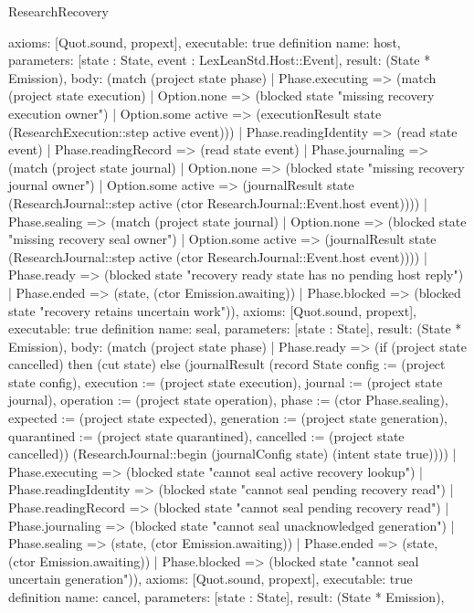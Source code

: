 \begin{lexlean}{ResearchRecovery}
\begin{semanticmodule}
{ axioms: [Quot.sound, propext],
 executable: true
}
definition{
 name: host,
 parameters: [state : State, event : LexLeanStd.Host::Event],
 result: (State * Emission),
 body: (match (project state phase) | Phase.executing => (match (project state execution) | Option.none => (blocked state "missing recovery execution owner") | Option.some active => (executionResult state (ResearchExecution::step active event))) | Phase.readingIdentity => (read state event) | Phase.readingRecord => (read state event) | Phase.journaling => (match (project state journal) | Option.none => (blocked state "missing recovery journal owner") | Option.some active => (journalResult state (ResearchJournal::step active (ctor ResearchJournal::Event.host event)))) | Phase.sealing => (match (project state journal) | Option.none => (blocked state "missing recovery seal owner") | Option.some active => (journalResult state (ResearchJournal::step active (ctor ResearchJournal::Event.host event)))) | Phase.ready => (blocked state "recovery ready state has no pending host reply") | Phase.ended => (state, (ctor Emission.awaiting)) | Phase.blocked => (blocked state "recovery retains uncertain work")),
 axioms: [Quot.sound, propext],
 executable: true
}
definition{
 name: seal,
 parameters: [state : State],
 result: (State * Emission),
 body: (match (project state phase) | Phase.ready => (if (project state cancelled) then (cut state) else (journalResult (record State {config := (project state config), execution := (project state execution), journal := (project state journal), operation := (project state operation), phase := (ctor Phase.sealing), expected := (project state expected), generation := (project state generation), quarantined := (project state quarantined), cancelled := (project state cancelled)}) (ResearchJournal::begin (journalConfig state) (intent state true)))) | Phase.executing => (blocked state "cannot seal active recovery lookup") | Phase.readingIdentity => (blocked state "cannot seal pending recovery read") | Phase.readingRecord => (blocked state "cannot seal pending recovery read") | Phase.journaling => (blocked state "cannot seal unacknowledged generation") | Phase.sealing => (state, (ctor Emission.awaiting)) | Phase.ended => (state, (ctor Emission.awaiting)) | Phase.blocked => (blocked state "cannot seal uncertain generation")),
 axioms: [Quot.sound, propext],
 executable: true
}
definition{
 name: cancel,
 parameters: [state : State],
 result: (State * Emission),
}
\end{semanticmodule}
\end{lexlean}
